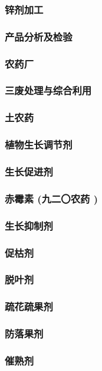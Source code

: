 \documentclass[UTF8]{../../ApplicationUniverse}
\begin{document}
            \subsubsection{锌剂加工}
    \subsubsection{产品分析及检验}
    \subsubsection{农药厂}
    \subsubsection{三废处理与综合利用}
\subsubsection{土农药}
\subsubsection{植物生长调节剂}
    \subsubsection{生长促进剂}
        \subsubsection{赤霉素 (九二〇农药 )}
    \subsubsection{生长抑制剂}
    \subsubsection{促枯剂}
    \subsubsection{脱叶剂}
    \subsubsection{疏花疏果剂}
    \subsubsection{防落果剂}
    \subsubsection{催熟剂}
\end{document}
